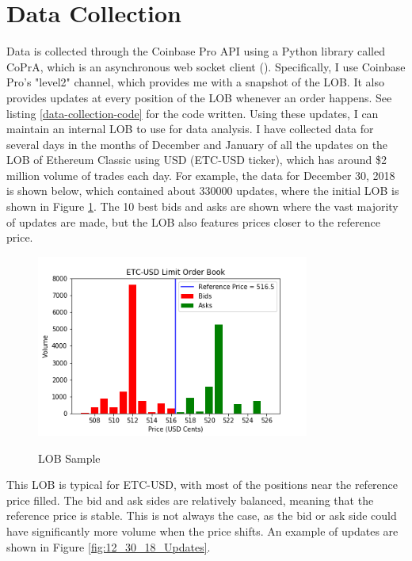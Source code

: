 \section{Data Collection}
Data is collected through the Coinbase Pro API using a Python library called CoPrA, which is an asynchronous web socket client (\cite{L3}). Specifically, I use Coinbase Pro's "level2" channel, which provides me with a snapshot of the LOB. It also provides updates at every position of the LOB whenever an order happens. See listing \ref{data-collection-code} for the code written. Using these updates, I can maintain an internal LOB to use for data analysis. I have collected data for several days in the months of December and January of all the updates on the LOB of Ethereum Classic using USD (ETC-USD ticker), which has around \$2 million volume of trades each day. For example, the data for December 30, 2018 is shown below, which contained about 330000 updates, where the initial LOB is shown  in Figure \ref{fig:12_30_18_LOB_pic}. The 10 best bids and asks are shown where the vast majority of updates are made, but the LOB also features prices closer to the reference price.

\begin{figure}[t]
\begin{center}
\caption{LOB Sample}
\includegraphics[width=0.8\textwidth]{Figures/12_30_18_LOB.png}
\label{fig:12_30_18_LOB_pic}
\end{center}
\end{figure}

This LOB is typical for ETC-USD, with most of the positions near the reference price filled. The bid and ask sides are relatively balanced, meaning that the reference price is stable. This is not always the case, as the bid or ask side could have significantly more volume when the price shifts. An example of updates are shown in Figure \ref{fig:12_30_18_Updates}.

